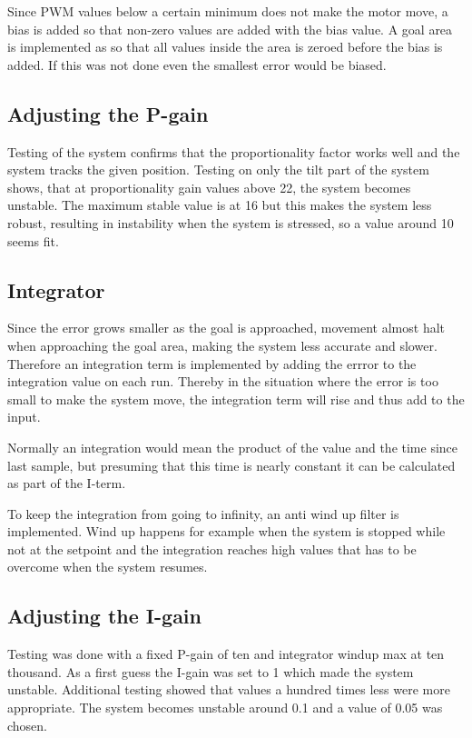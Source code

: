 Since PWM values below a certain minimum does not make the motor move, a bias is added so that non-zero values are added with the bias value. A goal area is implemented as so that all values inside the area is zeroed before the bias is added. If this was not done even the smallest error would be biased.

\subsection{Adjusting the P-gain}
Testing of the system confirms that the proportionality factor works well and the system tracks the given position. Testing on only the tilt part of the system shows, that at proportionality gain values above 22, the system becomes unstable. The maximum stable value is at 16 but this makes the system less robust, resulting in instability when the system is stressed, so a value around 10 seems fit.

\subsection{Integrator}
Since the error grows smaller as the goal is approached, movement almost halt when approaching the goal area, making the system less accurate and slower. Therefore an integration term is implemented by adding the errror to the integration value on each run. Thereby in the situation where the error is too small to make the system move, the integration term will rise and thus add to the input. 

Normally an integration would mean the product of the value and the time since last sample, but presuming that this time is nearly constant it can be calculated as part of the I-term. 

To keep the integration from going to infinity, an anti wind up filter is implemented. Wind up happens for example when the system is stopped while not at the setpoint and the integration reaches high values that has to be overcome when the system resumes.

\subsection{Adjusting the I-gain}
Testing was done with a fixed P-gain of ten and integrator windup max at ten thousand. As a first guess the I-gain was set to 1 which made the system unstable. Additional testing showed that values a hundred times less were more appropriate. The system becomes unstable around 0.1 and a value of 0.05 was chosen.

